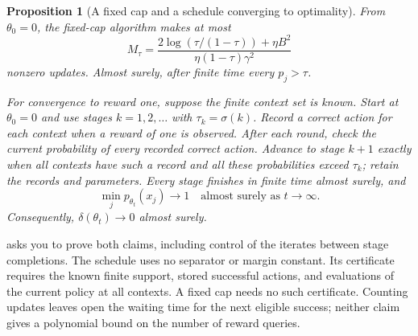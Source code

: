 \documentclass[11pt,twoside]{article}
\newtheorem{proposition}[theorem]{Proposition}
\theoremstyle{definition}
\theoremstyle{remark}
\begin{document}
\begin{proposition}[A fixed cap and a schedule converging to optimality]
\label{prop:capped-pg}
From $\theta_0=0$, the fixed-cap algorithm makes at most
\[
 M_\tau=\frac{2\log(\tau/(1-\tau))+\eta B^2}
 {\eta(1-\tau)\gamma^2}
\]
nonzero updates. Almost surely, after finite time every $p_j>\tau$.

For convergence to reward one, suppose the finite context set is known.
Start at $\theta_0=0$ and use stages $k=1,2,\ldots$ with
$\tau_k=\sigma(k)$. Record a correct action for each context when a
reward of one is observed. After each round, check the current probability
of every recorded correct action. Advance to stage $k+1$ exactly when
all contexts have such a record and all these probabilities exceed
$\tau_k$; retain the records and parameters. Every stage finishes in
finite time almost surely, and
\[
 \min_jp_{\theta_t}(x_j)\longrightarrow1
 \quad\text{almost surely as }t\to\infty.
\]
Consequently, $\delta(\theta_t)\to0$ almost surely.
\end{proposition}

 asks you to prove both claims, including control
of the iterates between stage completions. The schedule uses no separator
or margin constant. Its certificate requires the known finite support,
stored successful actions, and evaluations of the current policy at all
contexts. A fixed cap needs no such certificate. Counting updates leaves
open the waiting time for the next eligible success; neither claim gives
a polynomial bound on the number of reward queries.
\end{document}
